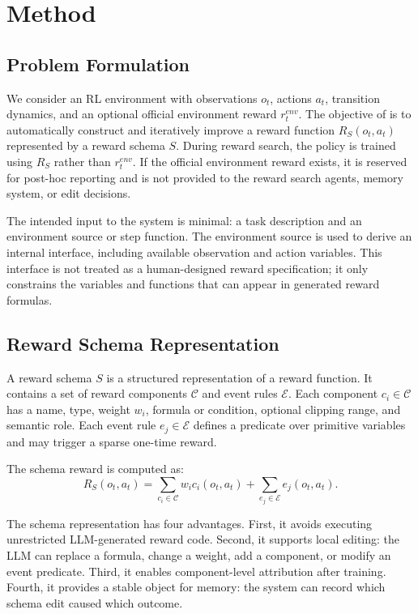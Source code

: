 \section{Method}

\subsection{Problem Formulation}

We consider an RL environment with observations $o_t$, actions $a_t$, transition dynamics, and an optional official environment reward $r^{env}_t$. The objective of \methodname{} is to automatically construct and iteratively improve a reward function $R_S(o_t,a_t)$ represented by a reward schema $S$. During reward search, the policy is trained using $R_S$ rather than $r^{env}_t$. If the official environment reward exists, it is reserved for post-hoc reporting and is not provided to the reward search agents, memory system, or edit decisions.

The intended input to the system is minimal: a task description and an environment source or step function. The environment source is used to derive an internal interface, including available observation and action variables. This interface is not treated as a human-designed reward specification; it only constrains the variables and functions that can appear in generated reward formulas.

\subsection{Reward Schema Representation}

A reward schema $S$ is a structured representation of a reward function. It contains a set of reward components $\mathcal{C}$ and event rules $\mathcal{E}$. Each component $c_i \in \mathcal{C}$ has a name, type, weight $w_i$, formula or condition, optional clipping range, and semantic role. Each event rule $e_j \in \mathcal{E}$ defines a predicate over primitive variables and may trigger a sparse one-time reward.

The schema reward is computed as:
\begin{equation}
R_S(o_t,a_t) =
\sum_{c_i \in \mathcal{C}} w_i c_i(o_t,a_t)
+
\sum_{e_j \in \mathcal{E}} e_j(o_t,a_t).
\end{equation}

The schema representation has four advantages. First, it avoids executing unrestricted LLM-generated reward code. Second, it supports local editing: the LLM can replace a formula, change a weight, add a component, or modify an event predicate. Third, it enables component-level attribution after training. Fourth, it provides a stable object for memory: the system can record which schema edit caused which outcome.


